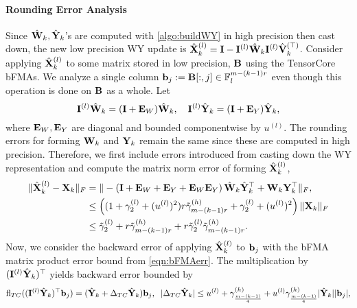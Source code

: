 \paragraph{Rounding Error Analysis} Since $\hat{\mathbf{W}}_{k},\hat{\mathbf{Y}}_k$'s are computed with \cref{algo:buildWY} in high precision then cast down, the new low precision WY update is $\hat{\mathbf{X}}_{k}^{(l)} = \mathbf{I}-\mathbf{I}^{(l)}\hat{\mathbf{W}}_k\mathbf{I}^{(l)}\hat{\mathbf{V}}_k^{(\top)}$.
Consider applying $\hat{\mathbf{X}}_k^{(l)}$ to some matrix stored in low precision, $\mathbf{B}$ using the TensorCore bFMAs.
We analyze a single column $\mathbf{b}_j:=\mathbf{B}[:,j] \in \mathbb{F}_l^{m-(k-1)r}$ even though this operation is done on $\mathbf{B}$ as a whole.
Let \[\mathbf{I}^{(l)}\hat{\mathbf{W}}_k = (\mathbf{I}+\mathbf{E}_W)\hat{\mathbf{W}}_k,\quad \mathbf{I}^{(l)}\hat{\mathbf{Y}}_k = (\mathbf{I}+\mathbf{E}_Y)\hat{\mathbf{Y}}_k,\] where $\mathbf{E}_W,\mathbf{E}_Y$ are diagonal and bounded componentwise by $u^{(l)}$.  
The rounding errors for forming $\mathbf{W}_k$ and $\mathbf{Y}_k$ remain the same since these are computed in high precision. 
Therefore, we first include errors introduced from casting down the WY representation and compute the matrix norm error of forming $\hat{\mathbf{X}}_{k}^{(l)}$,
\begin{align*}
	\|\hat{\mathbf{X}}_{k}^{(l)}- \mathbf{X}_{k}\|_F  &= \|-\left(\mathbf{I}+\mathbf{E}_W+\mathbf{E}_Y+ \mathbf{E}_W\mathbf{E}_Y\right)\hat{\mathbf{W}}_k\hat{\mathbf{Y}}_k^{\top} + \mathbf{W}_k\mathbf{Y}_k^{\top}\|_F,\\
	&\leq \left((1+\gamma_2^{(l)}+(u^{(l)})^2)r\tilde{\gamma}_{m-(k-1)r}^{(h)}+\gamma_2^{(l)}+(u^{(l)})^2\right)\|\mathbf{X}_k\|_F\\
	&\leq \tilde{\gamma}_2^{(l)} +r\tilde{\gamma}_{m-(k-1)r}^{(h)} + r\tilde{\gamma}_2^{(l)}\tilde{\gamma}_{m-(k-1)r}^{(h)}.
\end{align*}
Now, we consider the backward error of applying $\hat{\mathbf{X}}_{k}^{(l)}$ to $\mathbf{b}_j$ with the bFMA matrix product error bound from \cref{eqn:bFMAerr}.
The multiplication by $(\mathbf{I}^{(l)}\hat{\mathbf{Y}}_k)^{\top}$ yields backward error bounded by
\begin{equation*}
	\mathrm{fl}_{TC}((\mathbf{I}^{(l)}\hat{\mathbf{Y}}_k)^{\top}\mathbf{b}_j) = (\hat{\mathbf{Y}}_k+\Delta_{TC}\hat{\mathbf{Y}}_k)\mathbf{b}_j,\;\;|\Delta_{TC}\hat{\mathbf{Y}}_k| \leq u^{(l)}+\gamma_{\frac{m-(k-1)}{4}}^{(h)}+u^{(l)}\gamma_{\frac{m-(k-1)}{4}}^{(h)}|\hat{\mathbf{Y}}_k||\mathbf{b}_j|,
\end{equation*}
